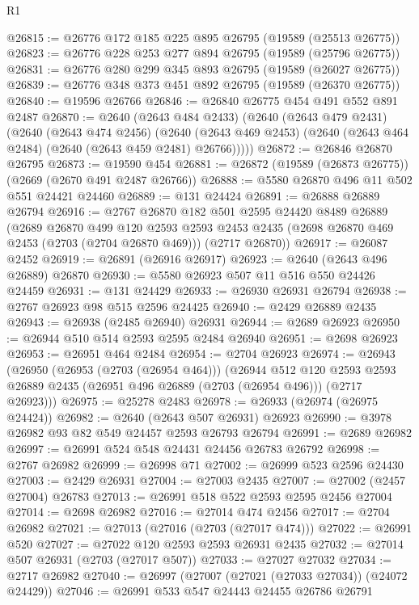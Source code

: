 \begin{lexlean}{R1}
\begin{coremodule}
@26815 := @26776 @172 @185 @225 @895 @26795 (@19589 (@25513 @26775))
@26823 := @26776 @228 @253 @277 @894 @26795 (@19589 (@25796 @26775))
@26831 := @26776 @280 @299 @345 @893 @26795 (@19589 (@26027 @26775))
@26839 := @26776 @348 @373 @451 @892 @26795 (@19589 (@26370 @26775))
@26840 := @19596 @26766
@26846 := @26840 @26775 @454 @491 @552 @891 @2487
@26870 := @2640
    (@2643 @484 @2433)
    (@2640
      (@2643 @479 @2431)
      (@2640
        (@2643 @474 @2456)
        (@2640 (@2643 @469 @2453) (@2640 (@2643 @464 @2484) (@2640 (@2643 @459 @2481) @26766)))))
@26872 := @26846 @26870 @26795
@26873 := @19590 @454
@26881 := @26872 (@19589 (@26873 @26775)) (@2669 (@2670 @491 @2487 @26766))
@26888 := @5580 @26870 @496 @11 @502 @551 @24421 @24460
@26889 := @131 @24424
@26891 := @26888 @26889 @26794
@26916 := @2767
    @26870
    @182
    @501
    @2595
    @24420
    @8489
    @26889
    (@2689
      @26870
      @499
      @120
      @2593
      @2593
      @2453
      @2435
      (@2698 @26870 @469 @2453 (@2703 (@2704 @26870 @469)))
      (@2717 @26870))
@26917 := @26087 @2452
@26919 := @26891 (@26916 @26917)
@26923 := @2640 (@2643 @496 @26889) @26870
@26930 := @5580 @26923 @507 @11 @516 @550 @24426 @24459
@26931 := @131 @24429
@26933 := @26930 @26931 @26794
@26938 := @2767 @26923 @98 @515 @2596 @24425
@26940 := @2429 @26889 @2435
@26943 := @26938 (@2485 @26940) @26931
@26944 := @2689 @26923
@26950 := @26944 @510 @514 @2593 @2595 @2484 @26940
@26951 := @2698 @26923
@26953 := @26951 @464 @2484
@26954 := @2704 @26923
@26974 := @26943
    (@26950
      (@26953 (@2703 (@26954 @464)))
      (@26944
        @512
        @120
        @2593
        @2593
        @26889
        @2435
        (@26951 @496 @26889 (@2703 (@26954 @496)))
        (@2717 @26923)))
@26975 := @25278 @2483
@26978 := @26933 (@26974 (@26975 @24424))
@26982 := @2640 (@2643 @507 @26931) @26923
@26990 := @3978 @26982 @93 @82 @549 @24457 @2593 @26793 @26794
@26991 := @2689 @26982
@26997 := @26991 @524 @548 @24431 @24456 @26783 @26792
@26998 := @2767 @26982
@26999 := @26998 @71
@27002 := @26999 @523 @2596 @24430
@27003 := @2429 @26931
@27004 := @27003 @2435
@27007 := @27002 (@2457 @27004) @26783
@27013 := @26991 @518 @522 @2593 @2595 @2456 @27004
@27014 := @2698 @26982
@27016 := @27014 @474 @2456
@27017 := @2704 @26982
@27021 := @27013 (@27016 (@2703 (@27017 @474)))
@27022 := @26991 @520
@27027 := @27022 @120 @2593 @2593 @26931 @2435
@27032 := @27014 @507 @26931 (@2703 (@27017 @507))
@27033 := @27027 @27032
@27034 := @2717 @26982
@27040 := @26997 (@27007 (@27021 (@27033 @27034)) (@24072 @24429))
@27046 := @26991 @533 @547 @24443 @24455 @26786 @26791

\end{coremodule}
\end{lexlean}
